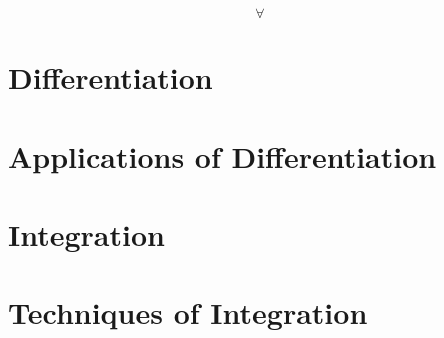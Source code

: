 \documentclass[11pt, a4paper, oneside]{memoir}
\begin{document}
\frontmatter*
{}




\clearpage

\thispagestyle{empty}
\vspace*{\fill}
\[ \forall \]
\vfill
\clearpage

\setcounter{page}{4}

\tableofcontents*



\mainmatter*
{}

\part{Differentiation}













\part{Applications of Differentiation}
\Blinddocument







\part{Integration}
\Blinddocument

\part{Techniques of Integration}
\Blinddocument
\end{document}
